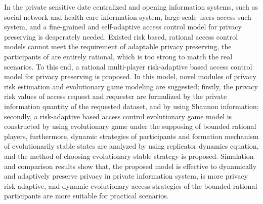 \begin{englishabstract}
	In the private sensitive date centralized and opening information systems, such as social network and health-care information system, large-scale users access such system, and a fine-grained and self-adaptive access control model for privacy preserving is desperately needed. Existed risk based, rational access control models cannot meet the requirement of adaptable privacy preserving, the participants of are entirely rational, which is too strong to match the real scenarios. To this end, a rational multi-player risk-adaptive based access control model for privacy preserving is proposed. In this model, novel modules of privacy risk estimation and evolutionary game modeling are suggested; firstly, the privacy risk values of access request and requester are formulized by the private information quantity of the requested dataset, and by using Shannon information; secondly, a risk-adaptive based access control evolutionary game model is constructed by using evolutionary game under the supposing of bounded rational players, furthermore, dynamic strategies of participants and formation mechanism of evolutionarily stable states are analyzed by using replicator dynamics equation, and the method of choosing evolutionary stable strategy is proposed. Simulation and comparison results show that, the proposed model is effective to dynamically and adaptively preserve privacy in private information system, is more privacy risk adaptive, and dynamic evolutionary access strategies of the bounded rational participants are more suitable for practical scenarios.
	
\end{englishabstract}